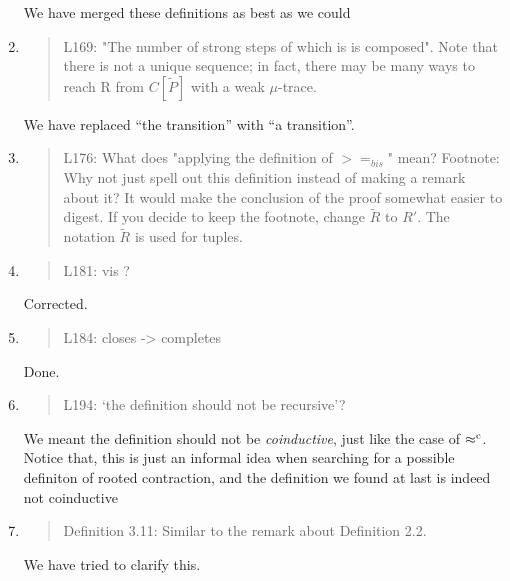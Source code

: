 \begin{enumerate}
  \Mark
  We have merged these definitions as best as we could

\item \begin{quote}
    L169: "The number of strong steps of which is is composed". Note
    that there is not a unique sequence; in fact, there may be many
    ways to reach R from $C[\tilde{P}]$ with a weak $\mu$-trace.
  \end{quote}

  \Mark
  We have replaced ``the transition'' with ``a transition''.

\item \begin{quote}
    L176: What does "applying the definition of $>=_{bis}$" mean?
    Footnote: Why not just spell out this definition instead of making a remark about it?  It would make the conclusion of the proof somewhat easier to digest. If you decide to keep the footnote, change $\tilde{R}$ to $R'$. The notation $\tilde{R}$ is used for tuples.
  \end{quote}

\item \begin{quote}
    L181: vis ?
  \end{quote}

  \Mark
 Corrected.
  
\item \begin{quote}
    L184: closes -> completes
  \end{quote}
   \Mark
 Done.
  
\item \begin{quote}
    L194: ‘the definition should not be recursive’?
  \end{quote}

  \Mark
  We meant the definition should not be \emph{coinductive}, just like the
  case of $\mathrel{\approx^{\rm{c}}}$. Notice that, this is just an informal idea when searching for
  a possible definiton of rooted contraction, and the definition we
  found at last is indeed not coinductive 
  
\item \begin{quote}
    Definition 3.11: Similar to the remark about Definition 2.2.
  \end{quote}

  \Mark
 We have tried to clarify this.
  

\end{enumerate}

